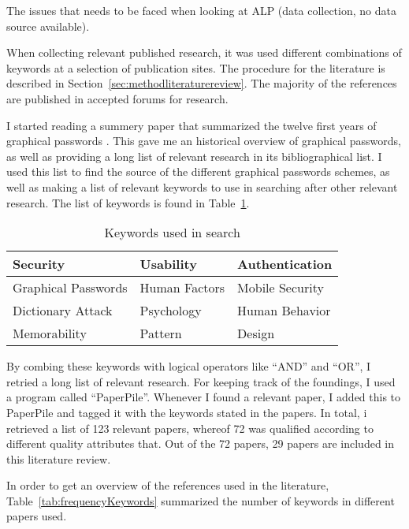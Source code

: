   The issues that needs to be faced when looking at ALP (data collection, no data source available).

  When collecting relevant published research, it was used different combinations of keywords at a selection of publication sites. The procedure for the literature is described in Section~\ref{sec:methodliteraturereview}.
  The majority of the references are published in accepted forums for research. 

  I started reading a summery paper that summarized the twelve first years of graphical passwords \cite{Biddle}. This gave me an historical overview of graphical passwords, as well as providing a long list of relevant research in its bibliographical list. I used this list to find the source of the different graphical passwords schemes, as well as making a list of relevant keywords to use in searching after other relevant research. The list of keywords is found in Table~\ref{tab:keywords}.

    \begin{table}
      \centering
      \begin{tabular}{| p{4cm} | p{4cm} | p{4cm} | }
        \hline
        Security & Usability & Authentication   \\ \hline
        Graphical Passwords & Human Factors & Mobile Security  \\ \hline
        Dictionary Attack & Psychology & Human Behavior \\ \hline
        Memorability & Pattern & Design \\ \hline
      \end{tabular}
      \caption{Keywords used in search}
      \label{tab:keywords}
    \end{table}

  By combing these keywords with logical operators like ``AND'' and ``OR'', I retried a long list of relevant research. For keeping track of the foundings, I used a program called ``PaperPile''. Whenever I found a relevant paper, I added this to PaperPile and tagged it with the keywords stated in the papers. In total, i retrieved a list of 123 relevant papers, whereof 72 was qualified according to different quality attributes that. Out of the 72 papers, 29 papers are included in this literature review.

  In order to get an overview of the references used in the literature, Table~\ref{tab:frequencyKeywords} summarized the number of keywords in different papers used. 

